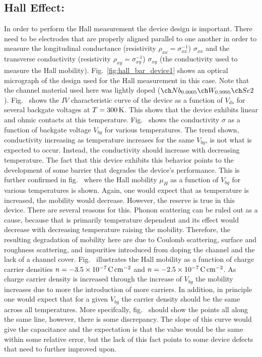 \subsection{Hall Effect: \lightlyfive}\label{subsec:hall_lightly}
In order to perform the Hall measurement the device design is important. There need to be electrodes that are properly aligned parallel to one another in order to measure the longitudinal conductance (resistivity $\rho_{xx}=\sigma_{xx}^{-1}$) $\sigma_{xx}$ and the transverse conductivity (resistivity $\rho_{xy}=\sigma_{xy}^{-1}$) $\sigma_{xy}$ (the conductivity used to measure the Hall mobility). Fig.~\ref{fig:hall_bar_device1} shows an optical micrograph of the design used for the Hall measurement in this case. Note that the channel material used here was lightly doped  ($\lightlyfive$). Fig.~ shows the $IV$ characteristic curve of the device as a function of $V_{ds}$ for several backgate voltages at $T=300\,\mathrm{K}$. This shows that the device exhibits linear and ohmic contacts at this temperature. Fig.~ shows the conductivity $\sigma$ as a function of backgate voltage $V_{bg}$ for various temperatures. The trend shown, conductivity increasing as temperature increases for the same $V_{bg}$, is not what is expected to occur. Instead, the conductivity should increase with decreasing temperature. The fact that this device exhibits this behavior points to the development of some barrier that degrades the device's performance. This is further confirmed in fig.~ where the Hall mobility $\mu_H$ as a function of $V_{bg}$ for various temperatures is shown. Again, one would expect that as temperature is increased, the mobility would decrease. However, the reserve is true in this device. There are several reasons for this. Phonon scattering can be ruled out as a cause, because that is primarily temperature dependent and its effect would decrease with decreasing temperature raising the mobility. Therefore, the resulting degradation of mobility here are due to Coulomb scattering, surface and roughness scattering, and impurities introduced from doping the channel and the lack of a \hbn channel cover. Fig.~ illustrates the Hall mobility as a function of charge carrier densities $n=-3.5\times 10^{-7}\,\mathrm{C}\,\mathrm{cm}^{-2}$ and $n=-2.5\times 10^{-7}\,\mathrm{C}\,\mathrm{cm}^{-2}$. As charge carrier density is increased through the increase of $V_{bg}$ the mobility increases due to more the introduction of more carriers. In addition, in principle one would expect that for a given $V_{bg}$ the carrier density should be the same across all temperatures. More specifcally, fig.~ should show the points all along the same line, however, there is some discrepancy. The slope of this curve would give the capacitance and the expectation is that the value would be the same within some relative error, but the lack of this fact points to some device defects that need to further improved upon.
